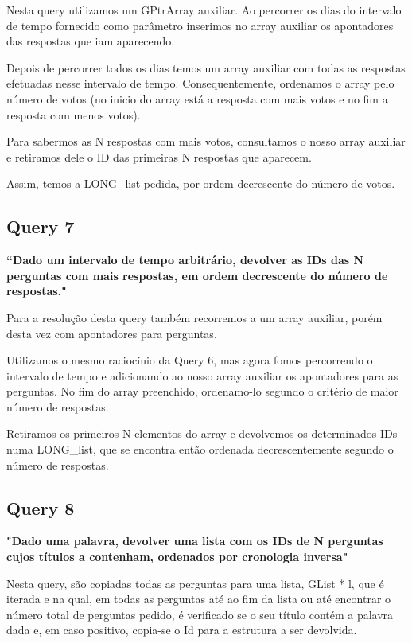 \documentclass[a4paper]{report}
\begin{document}
Nesta query utilizamos um GPtrArray auxiliar. Ao percorrer os dias do intervalo
de tempo fornecido como parâmetro inserimos no array auxiliar os apontadores das
respostas que iam aparecendo.

Depois de percorrer todos os dias temos um array auxiliar com todas as respostas
efetuadas nesse intervalo de tempo. Consequentemente, ordenamos o array pelo número
de votos (no inicio do array está a resposta com mais votos e no fim a resposta com menos votos).

Para sabermos as N respostas com mais votos, consultamos o nosso array auxiliar
e retiramos dele o ID das primeiras N respostas que aparecem.

Assim, temos a LONG\_list pedida, por ordem decrescente do número de votos.



\subsection*{Query 7}
\label{sec:query7}

\textbf{“Dado um intervalo de tempo arbitrário, devolver as IDs das N perguntas
com mais respostas, em ordem decrescente do número de respostas."}

Para a resolução desta query também recorremos a um array auxiliar, porém
desta vez com apontadores para perguntas.

Utilizamos o mesmo raciocínio da Query 6, mas agora fomos percorrendo o intervalo
de tempo e adicionando ao nosso array auxiliar os apontadores para as perguntas.
No fim do array preenchido, ordenamo-lo segundo o critério de maior número de respostas.

Retiramos os primeiros N elementos do array e devolvemos os determinados IDs
numa LONG\_list, que se encontra então ordenada decrescentemente segundo o número de respostas.


\subsection*{Query 8}
\label{sec:query8}

\textbf{"Dado uma palavra, devolver uma lista com os IDs de
N perguntas cujos títulos a contenham, ordenados por cronologia inversa"}

Nesta query, são copiadas todas as perguntas para uma lista, GList * l, que é iterada
e na qual, em todas as perguntas até ao fim da lista ou até encontrar o número total de
perguntas pedido, é verificado se o seu título contém a palavra dada e, em caso positivo,
copia-se o Id para a estrutura a ser devolvida.
\end{document}

